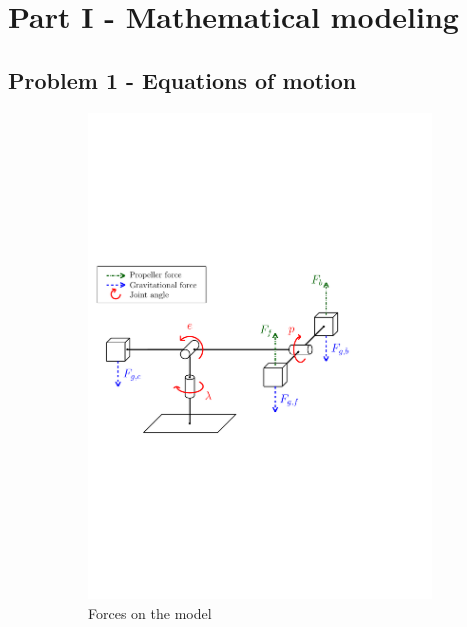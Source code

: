 \section{Part I - Mathematical modeling}\label{sec:part1}

\subsection{Problem 1 - Equations of motion}
\begin{figure}[h]
    \centering
    \begin{subfigure}{0.49\textwidth}
        \centering
        \includegraphics[width = \textwidth]{figures/forces.pdf}
        \caption{Forces on the model}
        \label{fig:forces}
    \end{subfigure}
    \begin{subfigure}{0.49\textwidth}
        \centering

\end{subfigure}
\end{figure}
